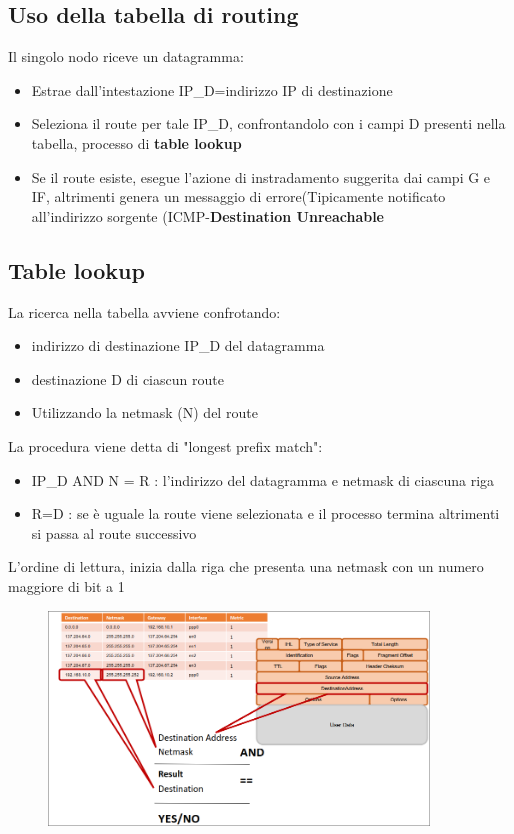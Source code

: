 \documentclass{report}
\begin{document}
                \subsection{Uso della tabella di routing}
                    Il singolo nodo riceve un datagramma:
                    \begin{itemize}
                        \item Estrae dall'intestazione IP\_D=indirizzo IP di destinazione
                        \item Seleziona il route per tale IP\_D, confrontandolo con i campi D presenti nella tabella, processo di \textbf{table lookup}
                        \item Se il route esiste, esegue l'azione di instradamento suggerita dai campi G e IF, altrimenti genera un messaggio di errore(Tipicamente notificato all'indirizzo sorgente (ICMP-\textbf{Destination Unreachable}
                    \end{itemize}
                \subsection{Table lookup}
                    La ricerca nella tabella avviene confrotando: 
                    \begin{itemize}
                        \item indirizzo di destinazione IP\_D del datagramma
                        \item  destinazione D di ciascun route
                        \item Utilizzando la netmask (N) del route
                    \end{itemize}
                    La procedura viene detta di "longest prefix match":
                    \begin{itemize}
                        \item IP\_D AND N = R : l'indirizzo del datagramma e netmask di ciascuna riga
                        \item R=D : se è uguale la route viene selezionata e il processo termina altrimenti si passa al route successivo
                    \end{itemize}
                    L'ordine di lettura, inizia dalla riga che presenta una netmask con un numero maggiore di bit a 1
                    \begin{figure}[H]
                        \includegraphics[width=0.9\textwidth]{1/tl.png}
                    \end{figure}
\end{document}

